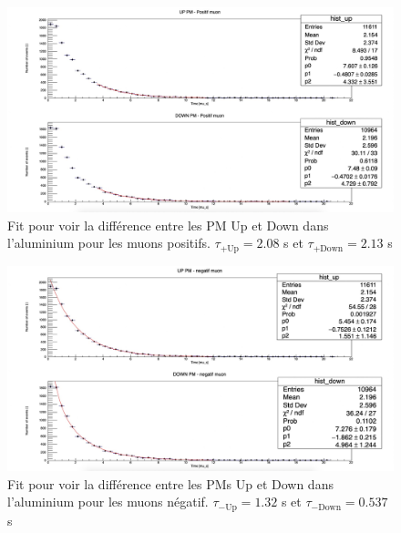 \documentclass[12pt]{article}
\begin{document}
\begin{figure}[htpb!]
    \centering
    \includegraphics[width=1.0\textwidth]{Images/Photos/UpDownPositifMuonAlu.jpeg}
    \caption{Fit pour voir la différence entre les PM Up et Down dans l'aluminium pour les muons positifs. $\tau_{+\text{Up}}=2.08$ \SIUnitSymbolMicro s et $\tau_{+\text{Down}}=2.13$ \SIUnitSymbolMicro s }
    \label{fig:UpDownPositifMuonAlu}
\end{figure}

\begin{figure}[htpb!]
    \centering
    \includegraphics[width=1.0\textwidth]{Images/Photos/UpDownNegatifMuonAlu.jpeg}
    \caption{Fit pour voir la différence entre les PMs Up et Down dans l'aluminium pour les muons négatif. $\tau_{-\text{Up}}=1.32$ \SIUnitSymbolMicro s et $\tau_{-\text{Down}}=0.537$ \SIUnitSymbolMicro s}
    \label{fig:UpDownNegatifMuonAlu}
\end{figure}
\end{document}
